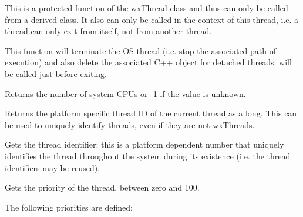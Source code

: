 \label{wxthreadexit}


This is a protected function of the wxThread class and thus can only be called
from a derived class. It also can only be called in the context of this
thread, i.e. a thread can only exit from itself, not from another thread.

This function will terminate the OS thread (i.e. stop the associated path of
execution) and also delete the associated C++ object for detached threads.
 will be called just before exiting.

\label{wxthreadgetcpucount}


Returns the number of system CPUs or -1 if the value is unknown.



\label{wxthreadgetcurrentid}


Returns the platform specific thread ID of the current thread as a
long.  This can be used to uniquely identify threads, even if they are
not wxThreads.

\label{wxthreadgetid}


Gets the thread identifier: this is a platform dependent number that uniquely identifies the
thread throughout the system during its existence (i.e. the thread identifiers may be reused).

\label{wxthreadgetpriority}


Gets the priority of the thread, between zero and 100.

The following priorities are defined:

\twocolwidtha{7cm}
\begin{twocollist}\itemsep=0pt
\end{twocollist}

